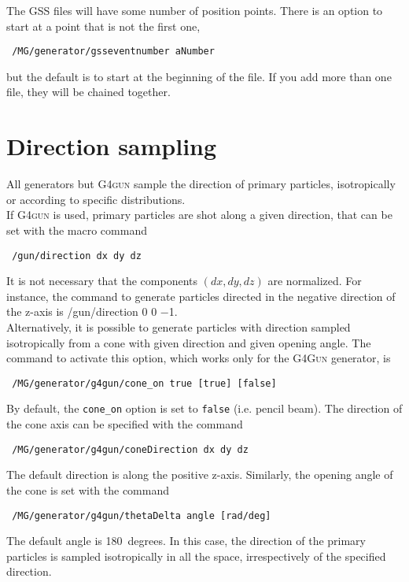 \noindent The GSS \rootv files will have some number of position points.  There is
an option to start at a point that is not the first one,

\begin{lstlisting}
 /MG/generator/gsseventnumber aNumber
\end{lstlisting}

\noindent but the default is to start at the beginning of the file.  If you add
more than one file, they will be chained together.


\section{Direction sampling} \label{sec:direction}
All generators but  \textsc{G4gun} sample the direction of primary particles, isotropically or 
according to specific distributions. \\

If \textsc{G4gun} is used, primary particles are shot along a given direction, 
that can be set with the macro command 
\begin{lstlisting}
 /gun/direction dx dy dz
\end{lstlisting}
It is not necessary that the components $(dx,dy,dz)$ are normalized. 
For instance, the command to generate particles directed in the negative direction 
of the z-axis is /gun/direction 0 0 $-$1. \\

Alternatively, it is possible to generate particles with direction sampled isotropically 
from a cone with given direction and given opening angle. The command to activate this 
option, which works only for the \textsc{G4Gun} generator, is
\begin{lstlisting}
 /MG/generator/g4gun/cone_on true [true] [false]
\end{lstlisting}
By default, the \texttt{cone\_on} option is set to \texttt{false} (i.e. pencil beam). 
The direction of the cone axis can be specified with the command
\begin{lstlisting}
 /MG/generator/g4gun/coneDirection dx dy dz
\end{lstlisting}
The default direction is along the positive z-axis. Similarly, the opening angle of the cone is 
set with the command
\begin{lstlisting}
 /MG/generator/g4gun/thetaDelta angle [rad/deg]
\end{lstlisting}
The default angle is 180~degrees. In this case, the direction of the primary particles is sampled 
isotropically in all the space, irrespectively of the specified direction.\\


